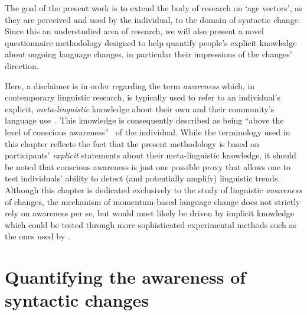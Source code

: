 The goal of the present work is to extend the body of research on `age vectors', as they are perceived and used by the individual, to the domain of syntactic change. Since this an understudied area of research, we will also present a novel questionnaire methodology designed to help quantify people's explicit knowledge about ongoing language changes, in particular their impressions of the changes' direction.

Here, a disclaimer is in order regarding the term \emph{awareness} which, in contemporary linguistic research, is typically used to refer to an individual's explicit, \emph{meta-linguistic} knowledge about their own and their community's language use~\citep{Preston2005}. This knowledge is consequently described as being ``above the level of conscious awareness''~\citep[p.283]{Baranowski2013} of the individual. While the terminology used in this chapter reflects the fact that the present methodology is based on participants' \emph{explicit} statements about their meta-linguistic knowledge, it should be noted that conscious awareness is just one possible proxy that allows one to test individuals' ability to detect (and potentially amplify) linguistic trends. Although this chapter is dedicated exclusively to the study of linguistic \emph{awareness} of changes, the mechanism of momentum-based language change does not strictly rely on awareness per se, but would most likely be driven by implicit knowledge which could be tested through more sophisticated experimental methods such as the ones used by \citet{Drager2005,Drager2011}.

\section{Quantifying the awareness of syntactic changes}

